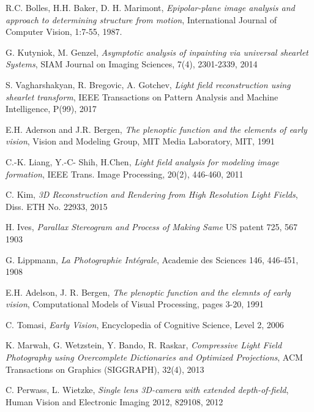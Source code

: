\documentclass[11pt, english, singlespacing, headsepline, ]{MastersDoctoralThesis}
\theoremstyle{definition}
\begin{document}
\begin{thebibliography}{90}

	R.C. Bolles, H.H. Baker, D. H. Marimont,
  \emph{Epipolar-plane image analysis and approach to determining structure from motion},
  International Journal of Computer Vision, 1:7-55,
  1987.

	G. Kutyniok, M. Genzel,
	\emph{Asymptotic analysis of inpainting via universal shearlet Systems},
	SIAM Journal on Imaging Sciences, 7(4), 2301-2339,
	2014

	S. Vagharshakyan, R. Bregovic, A. Gotchev,
	\emph{Light field reconstruction using shearlet transform},
	IEEE Transactions on Pattern Analysis and Machine Intelligence, P(99),
	2017

	E.H. Aderson and J.R. Bergen,
	\emph{The plenoptic function and the elements of early vision},
	Vision and Modeling Group, MIT Media Laboratory, MIT, 1991 

	C.-K. Liang, Y.-C- Shih, H.Chen,
	\emph{Light field analysis for modeling image formation},
	IEEE Trans. Image Processing, 20(2), 446-460, 
2011

	C. Kim,
  \emph{3D Reconstruction and Rendering from High Resolution Light Fields},
	Diss. ETH No. 22933, 
	2015
  
	H. Ives, 
	\emph{Parallax Stereogram and Process of Making Same}
	US patent 725, 567
	1903

	G. Lippmann, 
	\emph{La Photographie Int\'egrale},
	Academie des Sciences 146, 446-451,
  1908

	E.H. Adelson, J. R. Bergen,
	\emph{The plenoptic function and the elemnts of early vision},
	Computational Models of Visual Processing, pages 3-20,
	1991

	C. Tomasi,
	\emph{Early Vision},
	Encyclopedia of Cognitive Science, Level 2, 
   2006

	K. Marwah, G. Wetzstein, Y. Bando, R. Raskar,
	\emph{Compressive Light Field Photography using Overcomplete Dictionaries and Optimized Projections},
	ACM Transactions on Graphics (SIGGRAPH), 32(4), 
	2013

	C. Perwass, L. Wietzke,
	\emph{Single lens 3D-camera with extended depth-of-field},
	Human Vision and Electronic Imaging 2012, 829108,
	2012


\end{thebibliography}
\end{document}
